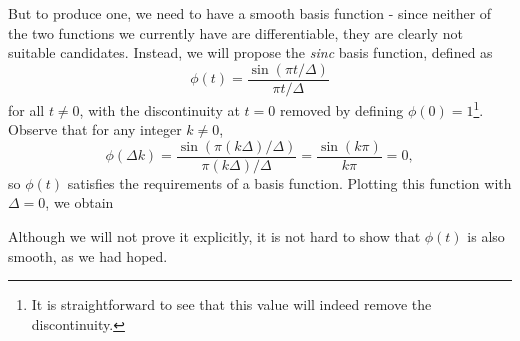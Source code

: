 \documentclass[letterpaper]{article}
\theoremstyle{remark}
\begin{document}
But to produce one, we need to have a smooth basis function - since neither of the two functions we currently have are differentiable, they are clearly not suitable candidates. Instead, we will propose the \emph{sinc} basis function, defined as
\[
    \phi(t) = \frac{\sin{(\pi t / \Delta)}}{\pi t / \Delta}
\]
for all $t \ne 0$, with the discontinuity at $t = 0$ removed by defining $\phi(0) = 1$\footnote{It is straightforward to see that this value will indeed remove the discontinuity.}. Observe that for any integer $k \ne 0$,
\[
    \phi(\Delta k) = \frac{\sin{(\pi (k\Delta) / \Delta)}}{\pi (k\Delta) / \Delta} = \frac{\sin(k\pi)}{k\pi} = 0,
\]
so $\phi(t)$ satisfies the requirements of a basis function. Plotting this function with $\Delta = 0$, we obtain
\begin{center}
\end{center}
Although we will not prove it explicitly, it is not hard to show that $\phi(t)$ is also smooth, as we had hoped.
\end{document}
